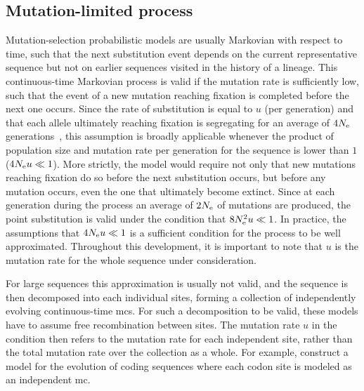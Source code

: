\subsection{Mutation-limited process}
\label{subsec:mutation-limited-assumption}

Mutation-selection probabilistic models are usually Markovian with respect to time, such that the next \gls{substitution} event depends on the current representative sequence but not on earlier sequences visited in the history of a lineage.
This continuous-time Markovian process is valid if the mutation rate is sufficiently low, such that the event of a new mutation reaching fixation is completed before the next one occurs.
Since the rate of \gls{substitution} is equal to $u$ (per generation) and that each \gls{allele} ultimately reaching fixation is segregating for an average of $4 N_{\textrm{e}}$ generations~\citep{Kimura1969}, this assumption is broadly applicable whenever the product of population size and mutation rate per generation for the sequence is lower than $1$ ($4 N_{\textrm{e}} u \ll 1$).
More strictly, the model would require not only that new mutations reaching fixation do so before the next \gls{substitution} occurs, but before any mutation occurs, even the one that ultimately become extinct.
Since at each generation during the process an average of $2N_{\textrm{e}}$ of mutations are produced, the point \gls{substitution} is valid under the condition that $8N_{\textrm{e}}^2 u \ll 1$.
In practice, the assumptions that $4 N_{\textrm{e}} u \ll 1$ is a sufficient condition for the process to be well approximated.
Throughout this development, it is important to note that $u$ is the mutation rate for the whole sequence under consideration.

For large sequences this approximation is usually not valid, and the sequence is then decomposed into each individual sites, forming a collection of independently evolving continuous-time \glspl{mc}.
For such a decomposition to be valid, these models have to assume free \gls{recombination} between sites.
The mutation rate $u$ in the condition then refers to the mutation rate for each independent site, rather than the total mutation rate over the collection as a whole.
For example, \citet{Halpern1998} construct a model for the evolution of coding sequences where each \gls{codon} site is modeled as an independent \gls{mc}.

